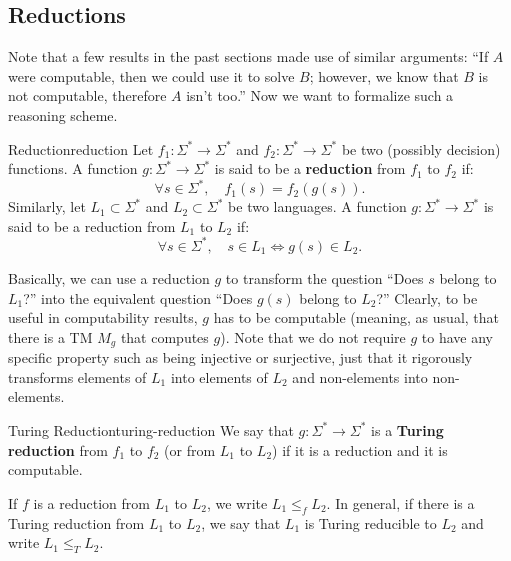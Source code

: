 \subsection{Reductions}
Note that a few results in the past sections made use of similar arguments: ``If \(A\) were computable, then we could use it to solve \(B\); however, we know that \(B\) is not computable, therefore \(A\) isn't too.'' Now we want to formalize such a reasoning scheme.

\begin{definition}{Reduction}{reduction}
    Let \(f_1 : \Sigma^* \rightarrow \Sigma^*\) and \(f_2 : \Sigma^* \rightarrow \Sigma^*\) be two (possibly decision) functions. A function \(g : \Sigma^* \rightarrow \Sigma^*\) is said to be a \textbf{reduction} from \(f_1\) to \(f_2\) if:
    \[
    \forall s \in \Sigma^*, \quad f_1(s) = f_2(g(s)).
    \]
    Similarly, let \(L_1 \subset \Sigma^*\) and \(L_2 \subset \Sigma^*\) be two languages. A function \(g : \Sigma^* \rightarrow \Sigma^*\) is said to be a reduction from \(L_1\) to \(L_2\) if:
    \[
    \forall s \in \Sigma^*, \quad s \in L_1 \iff g(s) \in L_2.
    \]
\end{definition}

\noindent Basically, we can use a reduction \(g\) to transform the question ``Does \(s\) belong to \(L_1\)?'' into the equivalent question ``Does \(g(s)\) belong to \(L_2\)?'' 
Clearly, to be useful in computability results, \(g\) has to be computable (meaning, as usual, that there is a TM \(M_g\) that computes \(g\)). Note that we do not require \(g\) to have any specific property such as being injective or surjective, just that it rigorously transforms elements of \(L_1\) into elements of \(L_2\) and non-elements into non-elements.

\begin{definition}{Turing Reduction}{turing-reduction}
    We say that \(g : \Sigma^* \rightarrow \Sigma^*\) is a \textbf{Turing reduction} from \(f_1\) to \(f_2\) (or from \(L_1\) to \(L_2\)) if it is a reduction and it is computable.
\end{definition}

\noindent If \(f\) is a reduction from \(L_1\) to \(L_2\), we write \(L_1 \le_f L_2\). In general, if there is a Turing reduction from \(L_1\) to \(L_2\), we say that \(L_1\) is Turing reducible to \(L_2\) and write \(L_1 \le_T L_2\).

